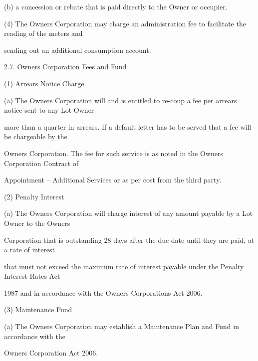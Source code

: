 \documentclass{article}
\begin{document}
{\fontsize{9.962}{1}(b) a concession or rebate that is paid directly to the Owner or occupier. }

\newpage



















{\fontsize{9.962}{1}(4) The Owners Corporation may charge an administration fee to facilitate the reading of the meters and }

{\fontsize{10.02}{1}sending out an additional consumption account. }

{\fontsize{9.99}{1}2.7. Owners Corporation Fees and Fund }

{\fontsize{9.962}{1}(1) Arrears Notice Charge }

{\fontsize{9.962}{1}(a) The Owners Corporation will and is entitled to re-coup a fee per arrears notice sent to any Lot Owner }

{\fontsize{10.02}{1}more than a quarter in arrears. If a default letter has to be served that a fee will be chargeable by the }

{\fontsize{10.02}{1}Owners Corporation. The fee for such service is as noted in the Owners Corporation Contract of }

{\fontsize{10.02}{1}Appointment – Additional Services or as per cost from the third party. }

{\fontsize{9.962}{1}(2) Penalty Interest }

{\fontsize{9.962}{1}(a) The Owners Corporation will charge interest of any amount payable by a Lot Owner to the Owners }

{\fontsize{10.02}{1}Corporation that is outstanding 28 days after the due date until they are paid, at a rate of interest }

{\fontsize{10.02}{1}that must not exceed the maximum rate of interest payable under the Penalty Interest Rates Act }

{\fontsize{10.02}{1}1987 and in accordance with the Owners Corporations Act 2006. }

{\fontsize{9.962}{1}(3) Maintenance Fund }

{\fontsize{9.962}{1}(a) The Owners Corporation may establish a Maintenance Plan and Fund in accordance with the }

{\fontsize{10.02}{1}Owners Corporation Act 2006. }
\end{document}
